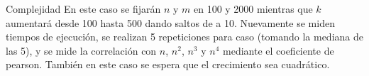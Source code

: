 \begin{subsection}{Complejidad}
En este caso se fijarán $n$ y $m$ en 100 y 2000 mientras que $k$ aumentará desde 100 hasta 500 dando saltos de a 10. Nuevamente se miden tiempos de ejecución, se realizan 5 repeticiones para caso (tomando la mediana de las 5), y se mide la correlación con $n$, $n^2$, $n^3$ y $n^4$ mediante el coeficiente de pearson. También en este caso se espera que el crecimiento sea cuadrático. 



\end{subsection}
